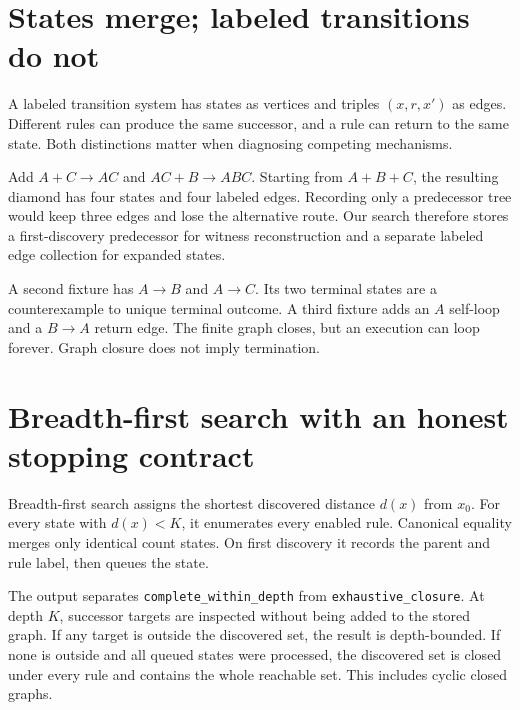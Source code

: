\section{States merge; labeled transitions do not}
A labeled transition system has states as vertices and triples $(x,r,x')$ as
edges. Different rules can produce the same successor, and a rule can return to
the same state. Both distinctions matter when diagnosing competing mechanisms.


Add $A+C\to AC$ and $AC+B\to ABC$. Starting from $A+B+C$, the resulting diamond
has four states and four labeled edges. Recording only a predecessor tree would
keep three edges and lose the alternative route. Our search therefore stores a
first-discovery predecessor for witness reconstruction and a separate labeled
edge collection for expanded states.

A second fixture has $A\to B$ and $A\to C$. Its two terminal states are a
counterexample to unique terminal outcome. A third fixture adds an $A$ self-loop
and a $B\to A$ return edge. The finite graph closes, but an execution can loop
forever. Graph closure does not imply termination.

\section{Breadth-first search with an honest stopping contract}
Breadth-first search assigns the shortest discovered distance $d(x)$ from $x_0$.
For every state with $d(x)<K$, it enumerates every enabled rule. Canonical equality
merges only identical count states. On first discovery it records the parent and
rule label, then queues the state.


The output separates \texttt{complete\_within\_depth} from
\texttt{exhaustive\_closure}. At depth $K$, successor targets are inspected without
being added to the stored graph. If any target is outside the discovered set,
the result is depth-bounded. If none is outside and all queued states were
processed, the discovered set is closed under every rule and contains the whole
reachable set. This includes cyclic closed graphs.

